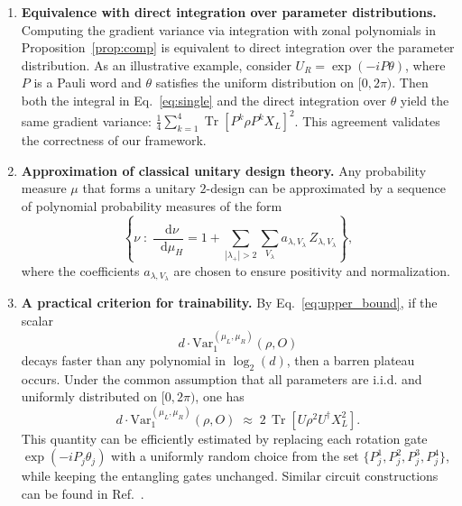 \documentclass[%
 superscriptaddress,
 aps,prl,
 reprint,
 twocolumn,
 amsmath,amssymb,showpacs,
 bibnotes,
]{revtex4-2}
\newcommand*{\dif}{\mathop{}\!\mathrm{d}}
\begin{document}
\begin{enumerate}
    \item[(i)] \textbf{Equivalence with direct integration over parameter distributions.}
    Computing the gradient variance via integration with zonal polynomials in Proposition~\ref{prop:comp} is equivalent to direct integration over the parameter distribution. As an illustrative example, consider $U_R = \exp(-i P \theta)$, where $P$ is a Pauli word and $\theta$ satisfies the uniform distribution on $[0,2\pi)$. Then both the integral in Eq.~\eqref{eq:single} and the direct integration over $\theta$ yield the same gradient variance: $\frac{1}{4}\sum_{k=1}^4 \operatorname{Tr}\!\left[P^k \rho P^k X_L\right]^2$.
    This agreement validates the correctness of our framework.

    \item[(ii)] \textbf{Approximation of classical unitary design theory.}
    Any probability measure $\mu$ that forms a unitary $2$-design can be approximated by a sequence of polynomial probability measures of the form
    \begin{equation}
        \left\{
        \nu \;:\;
        \frac{\dif \nu}{\dif \mu_H}
        =
        1 + \sum_{|\lambda_+| > 2} \sum_{V_\lambda}
        a_{\lambda, V_\lambda} \, Z_{\lambda, V_\lambda}
        \right\},
    \end{equation}
    where the coefficients $a_{\lambda, V_\lambda}$ are chosen to ensure positivity and normalization.

    \item[(iii)] \textbf{A practical criterion for trainability.}
    By Eq.~\ref{eq:upper_bound}, if the scalar
    \[
        d \cdot \mathrm{Var}_1^{(\mu_L,\mu_R)}(\rho, O)
    \]
    decays faster than any polynomial in $\log_2(d)$, then a barren plateau occurs. Under the common assumption that all parameters are i.i.d. and uniformly distributed on $[0, 2\pi)$, one has
    \begin{equation}
        d \cdot \mathrm{Var}_1^{(\mu_L,\mu_R)}(\rho, O)
        \;\approx\;
        2\,\operatorname{Tr}\!\left[U \rho^2 U^\dagger X_L^2\right].
    \end{equation}
   This quantity can be efficiently estimated by replacing each rotation gate $\exp(-i P_j \theta_j)$ with a uniformly random choice from the set $\{P_j^1, P_j^2, P_j^3, P_j^4\}$, while keeping the entangling gates unchanged. Similar circuit constructions can be found in Ref.~\cite{arute2019quantum}.
\end{enumerate}
\end{document}
